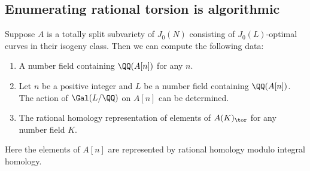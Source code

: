 \documentclass{article}
\begin{document}
\subsection{Enumerating rational torsion is algorithmic}

\begin{proposition}
    Suppose $A$ is a totally split subvariety of $J_0(N)$ consisting of
    $J_0(L)$-optimal curves in their isogeny class. Then we can compute
    the following data:
    \begin{enumerate}
        \item
            A number field containing $\QQ(A[n])$ for any $n$.
        \item
            Let $n$ be a positive integer and $L$ be a number field containing
            $\QQ(A[n])$. The action of $\Gal(L/\QQ)$ on $A[n]$ can be
            determined.
        \item 
            The rational homology representation of elements of $A(K)_\tor$ for any
            number field $K$.
    \end{enumerate}
    Here the elements of $A[n]$ are represented by rational homology modulo
    integral homology.
\end{proposition}
\end{document}
